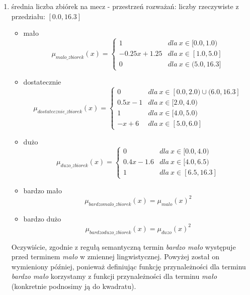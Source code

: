 \documentclass{classrep}
\begin{document}
\begin{enumerate}
    \item średnia liczba zbiórek na mecz - przestrzeń rozważań: liczby rzeczywiste z przedziału: $[0.0, 16.3]$
    \begin{itemize}
        \item mało
        \begin{equation}
            \mu_{malo\_zbiorek}(x) = \left\{\begin{matrix} 1 & dla \: x\in[0.0, 1.0) \\ -0.25x + 1.25 & dla \: x\in [1.0, 5.0] \\ 0 & dla \: x\in (5.0, 16.3] \end{matrix}\right.
        \end{equation}
         \item dostatecznie
        \begin{equation}
            \mu_{dostatecznie\_zbiorek}(x) = \left\{\begin{matrix}0 & dla \: x\in [0.0, 2.0) \cup (6.0, 16.3] \\ 0.5x - 1 & dla \: x\in[2.0, 4.0) \\ 1 & dla \: x\in [4.0, 5.0) \\ -x + 6 & dla \: x\in [5.0, 6.0] \end{matrix}\right.
        \end{equation}
        \item dużo
        \begin{equation}
            \mu_{duzo\_zbiorek}(x) = \left\{\begin{matrix} 0 & dla \: x\in [0.0, 4.0) \\ 0.4x - 1.6 & dla \: x\in[4.0, 6.5) \\ 1 & dla \: x\in [6.5,  16.3] \end{matrix}\right.
        \end{equation}
        \item bardzo mało
        \begin{equation}
            \mu_{bardzomalo\_zbiorek}(x) = \mu_{malo}(x)^2
        \end{equation}
        \item bardzo dużo
        \begin{equation}
            \mu_{bardzoduzo\_zbiorek}(x) = \mu_{duzo}(x)^2
        \end{equation}
    \end{itemize}
    Oczywiście, zgodnie z regułą semantyczną termin \textit{bardzo mało} występuje przed terminem \textit{mało} w zmiennej lingwistycznej. Powyżej został on wymieniony później, ponieważ definiując funkcję przynależności dla terminu \textit{bardzo mało} korzystamy z funkcji przynależności dla terminu \textit{mało} (konkretnie podnosimy ją do kwadratu).

\end{enumerate}
\end{document}
